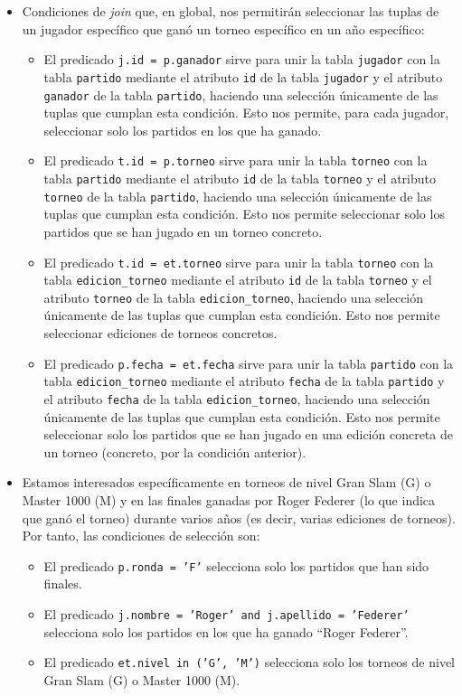 \documentclass[11pt]{opticajnl}
\begin{document}
\begin{itemize}
\item Condiciones de \textit{join} que, en global, nos permitirán seleccionar las tuplas de un jugador específico que ganó un torneo específico en un año específico:
\begin{itemize}
\item El predicado \texttt{j.id = p.ganador} sirve para unir la tabla \texttt{jugador} con la tabla \texttt{partido} mediante el atributo \texttt{id} de la tabla \texttt{jugador} y el atributo \texttt{ganador} de la tabla \texttt{partido}, haciendo una selección únicamente de las tuplas que cumplan esta condición. Esto nos permite, para cada jugador, seleccionar solo los partidos en los que ha ganado.
\item El predicado \texttt{t.id = p.torneo} sirve para unir la tabla \texttt{torneo} con la tabla \texttt{partido} mediante el atributo \texttt{id} de la tabla \texttt{torneo} y el atributo \texttt{torneo} de la tabla \texttt{partido}, haciendo una selección únicamente de las tuplas que cumplan esta condición. Esto nos permite seleccionar solo los partidos que se han jugado en un torneo concreto.
\item El predicado \texttt{t.id = et.torneo} sirve para unir la tabla \texttt{torneo} con la tabla \texttt{edicion\_torneo} mediante el atributo \texttt{id} de la tabla \texttt{torneo} y el atributo \texttt{torneo} de la tabla \texttt{edicion\_torneo}, haciendo una selección únicamente de las tuplas que cumplan esta condición. Esto nos permite seleccionar ediciones de torneos concretos.
\item El predicado \texttt{p.fecha = et.fecha} sirve para unir la tabla \texttt{partido} con la tabla \texttt{edicion\_torneo} mediante el atributo \texttt{fecha} de la tabla \texttt{partido} y el atributo \texttt{fecha} de la tabla \texttt{edicion\_torneo}, haciendo una selección únicamente de las tuplas que cumplan esta condición. Esto nos permite seleccionar solo los partidos que se han jugado en una edición concreta de un torneo (concreto, por la condición anterior).
\end{itemize}
\item Estamos interesados específicamente en torneos de nivel Gran Slam (G) o Master 1000 (M) y en las finales ganadas por Roger Federer (lo que indica que ganó el torneo) durante varios años (es decir, varias ediciones de torneos). Por tanto, las condiciones de selección son:
\begin{itemize}
\item El predicado \texttt{p.ronda = 'F'} selecciona solo los partidos que han sido finales.
\item El predicado \texttt{j.nombre = 'Roger' and j.apellido = 'Federer'} selecciona solo los partidos en los que ha ganado ``Roger Federer''.
\item El predicado \texttt{et.nivel in ('G', 'M')} selecciona solo los torneos de nivel Gran Slam (G) o Master 1000 (M).
\end{itemize}
\end{itemize}
\end{document}
